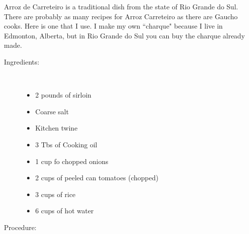 \documentclass[11pt,letterpaper]{article}
\begin{document}


Arroz de Carreteiro is a traditional dish from the state of Rio Grande do Sul. There are probably as many recipes for Arroz Carreteiro as there are Gaucho cooks. Here is one that I use. I make my own ``charque" because I live in Edmonton, Alberta, but in Rio Grande do Sul you can buy the charque already made.

\vspace{0.3in}

\begin{description}

\item[Ingredients:]\ \\
	\begin{itemize}
	\item	2 pounds of sirloin 
	\item Coarse salt
	\item Kitchen twine
	\item 3 Tbs of Cooking oil
	\item 1 cup fo chopped onions
	\item 2 cups of peeled can tomatoes (chopped)
	\item 3 cups of rice
	\item 6 cups of hot water
	\end{itemize}

\item[Procedure:]\ \\


\end{description}
\end{document}
